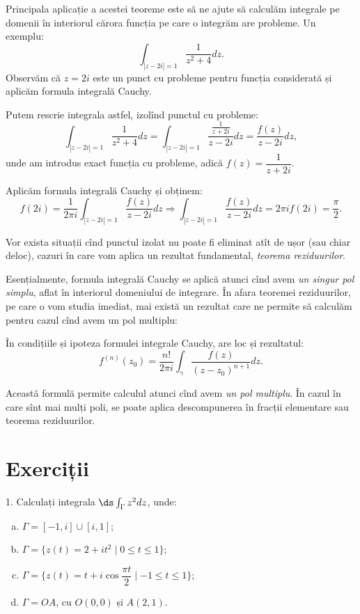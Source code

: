 Principala aplicație a acestei teoreme este să ne ajute să calculăm integrale pe
domenii în interiorul cărora funcția pe care o integrăm are probleme. Un exemplu:
\[
  \int_{|z - 2i| = 1} \dfrac{1}{z^2 + 4} dz.
\]
Observăm că $ z = 2i $ este un punct cu probleme pentru funcția considerată și
aplicăm formula integrală Cauchy.

Putem rescrie integrala astfel, izolînd punctul cu probleme:
\[
  \int_{|z - 2i| = 1} \dfrac{1}{z^2 + 4} dz = \int_{|z - 2i| = 1} \dfrac{\frac{1}{z + 2i}}{z - 2i} dz = %
  \dfrac{f(z)}{z - 2i} dz,
\]
unde am introdus exact funcția cu probleme, adică $ f(z) = \dfrac{1}{z + 2i} $.

Aplicăm formula integrală Cauchy și obținem:
\[
  f(2i) = \dfrac{1}{2\pi i} \int_{|z - 2i| = 1} \dfrac{f(z)}{z - 2i} dz \Rightarrow %
  \int_{|z - 2i| = 1} \dfrac{f(z)}{z - 2i} dz = 2\pi i f(2i) = \dfrac{\pi}{2}.
\]

Vor exista situații cînd punctul izolat nu poate fi eliminat atît de ușor (sau chiar deloc),
cazuri în care vom aplica un rezultat fundamental, \emph{teorema reziduurilor}.

Esențialmente, formula integrală Cauchy se aplică atunci cînd avem \emph{un singur pol simplu},
aflat în interiorul domeniului de integrare. În afara teoremei reziduurilor, pe care o vom
studia imediat, mai există un rezultat care ne permite să calculăm pentru cazul cînd
avem un pol multiplu:

\begin{theorem}\label{thm:fic-der}
  În condițiile și ipoteza formulei integrale Cauchy, are loc și rezultatul:
  \[
    f^{(n)}(z_0) = \dfrac{n!}{2\pi i} \int_\gamma \dfrac{f(z)}{(z - z_0)^{n+1}} dz.
  \]
\end{theorem}

Această formulă permite calculul atunci cînd avem \emph{un pol multiplu}. În cazul
în care sînt mai mulți poli, se poate aplica descompunerea în fracții elementare
sau teorema reziduurilor.



\section{Exerciții}

1. Calculați integrala $ \ds\int_{\Gamma} z^2 dz $, unde:
\begin{enumerate}[(a)]
\item $ \Gamma = [-1, i] \cup [i, 1] $;
\item $ \Gamma = \{ z(t) = 2 + it^2 \mid 0 \leq t \leq 1 \} $;
\item $ \Gamma = \{ z(t) = t + i \cos \dfrac{\pi t}{2} \mid -1 \leq t \leq 1 \} $;
\item $ \Gamma = OA $, cu $O(0, 0) $ și $ A(2, 1) $.
\end{enumerate}

